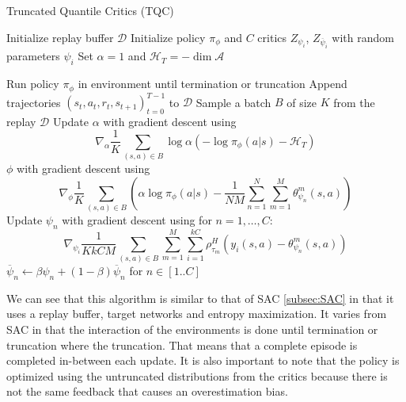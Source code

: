 \begin{algorithm}[H]
\caption{Truncated Quantile Critics (TQC)}
\begin{algorithmic}[1]
\State Initialize replay buffer $\mathcal{D}$
\State Initialize policy $\pi_{\phi}$ and $C$ critics $Z_{\psi_i}$, $Z_{\overline{\psi}_i}$ with random parameters $\psi_i$
\State Set $\alpha = 1$ and $\mathcal{H}_T = -\dim \mathcal{A}$

\Repeat
    \State Run policy $\pi_{\phi}$ in environment until termination or truncation
    \State Append trajectories $(s_t, a_t, r_t, s_{t+1})_{t=0}^{T-1}$ to $\mathcal{D}$
        \State Sample a batch $B$ of size $K$ from the replay $\mathcal{D}$
        \State Update $\alpha$ with gradient descent using
        \[
        \nabla_{\alpha} \frac{1}{K} \sum_{(s,a)\in B} \log \alpha (-\log \pi_{\phi}(a|s)- \mathcal{H}_T) 
        \]
        \State $\phi$ with gradient descent using
        \[
        \nabla_{\phi} \frac{1}{K} \sum_{(s,a) \in B}\left(\alpha \log \pi_\phi(a|s) - \frac{1}{NM} \sum_{n=1}^{N} \sum_{m=1}^{M} \theta_{\psi_n}^m(s, a)\right)
        \]
        \State Update $\psi_n$ with gradient descent using for $n=1,\ldots,C$:
        \[
            \nabla_{\psi_i} \frac{1}{KkCM} \sum_{(s,a) \in B} \sum_{m=1}^M \sum_{i=1}^{kC} \rho_{\tau_m}^H \left( y_i(s,a) - \theta_{\psi_n}^{m}(s,a)\right)
        \]
        \vspace{1pt}
        \State  $\overline{\psi}_n \leftarrow  \beta \psi_n  + (1 - \beta) \overline{\psi}_n $ for $n\in[1..C]$
    \EndFor
{}
\end{algorithmic}
\end{algorithm}

We can see that this algorithm is similar to that of SAC \ref{subsec:SAC} in that it uses a replay buffer, target networks and entropy maximization. It varies from SAC in that the interaction of the environments is done until termination or truncation where the truncation. That means that a complete episode is completed in-between each update. It is also important to note that the policy is optimized using the untruncated distributions from the critics because there is not the same feedback that causes an overestimation bias.

